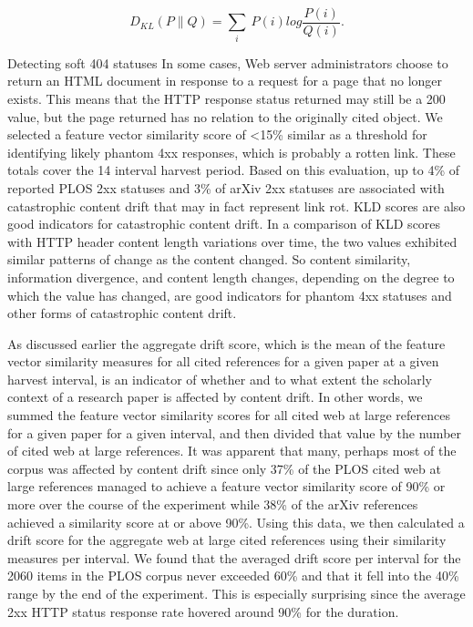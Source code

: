 \documentclass[12pt]{article}
\begin{document}
    \[
       D_{KL}({P}\parallel{Q}) = {\sum_i} \ P(i) log \frac{P(i)}{Q(i)}.
    \]

Detecting soft 404 statuses
In some cases, Web server administrators choose to return an HTML document in response to a request for a page that no longer exists. This means that the HTTP response status returned may still be a 200 value, but the page returned has no relation to the originally cited object. We selected a feature vector similarity score of <15\% similar as a threshold for identifying likely phantom 4xx responses, which is probably a rotten link. These totals cover the 14 interval harvest period. Based on this evaluation, up to 4\% of reported PLOS 2xx statuses and  3\% of arXiv 2xx statuses are associated with catastrophic content drift that may in fact represent link rot. KLD scores are also good indicators for catastrophic content drift. In a comparison of KLD scores with HTTP header content length variations over time, the two values exhibited similar patterns of change as the content changed. So content similarity, information divergence, and content length changes, depending on the degree to which the value has changed, are good indicators for phantom 4xx statuses and other forms of catastrophic content drift.  

As discussed earlier the aggregate drift score, which is the mean of the feature vector similarity measures for all cited references for a given paper at a given harvest interval, is an indicator of whether and to what extent the scholarly context of a research paper is affected by content drift. In other words, we summed the feature vector similarity scores for all cited web at large references for a given paper for a given interval, and then divided that value by the number of cited web at large references. It was apparent that many, perhaps most of the corpus was affected by content drift since only 37\% of the PLOS cited web at large references managed to achieve a  feature vector similarity score of 90\% or more over the course of the experiment while 38\% of the arXiv references achieved a similarity score at or above 90\%. Using this data, we then calculated a drift score for the aggregate web at large cited references using their similarity measures per interval. We found that the averaged drift score per interval for the 2060 items in the PLOS corpus never exceeded 60\% and that it fell into the 40\% range by the end of the experiment. This is especially surprising since the average 2xx HTTP status response rate hovered around 90\% for the duration.
\end{document}
